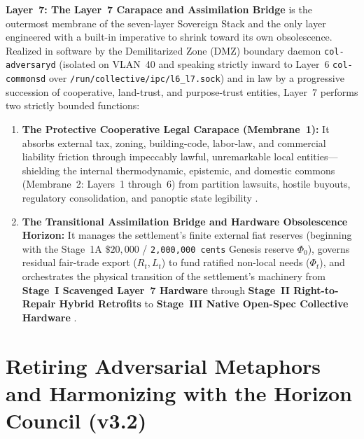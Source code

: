 \textbf{Layer~7: The Layer~7 Carapace and Assimilation Bridge} is the outermost membrane of the seven-layer Sovereign Stack and the only layer engineered with a built-in imperative to shrink toward its own obsolescence. Realized in software by the Demilitarized Zone (DMZ) boundary daemon \texttt{col-adversaryd} (isolated on VLAN~40 and speaking strictly inward to Layer~6 \texttt{col-commonsd} over \texttt{/run/collective/ipc/l6\_l7.sock}) and in law by a progressive succession of cooperative, land-trust, and purpose-trust entities, Layer~7 performs two strictly bounded functions:
\begin{enumerate}
    \item \textbf{The Protective Cooperative Legal Carapace (Membrane~1):} It absorbs external tax, zoning, building-code, labor-law, and commercial liability friction through impeccably lawful, unremarkable local entities---shielding the internal thermodynamic, epistemic, and domestic commons (Membrane~2: Layers~1 through~6) from partition lawsuits, hostile buyouts, regulatory consolidation, and panoptic state legibility \parencite{scott1998,ostrom1990}.
    \item \textbf{The Transitional Assimilation Bridge and Hardware Obsolescence Horizon:} It manages the settlement's finite external fiat reserves (beginning with the Stage~1A $\$20{,}000$ / \texttt{2,000,000 cents} Genesis reserve $\Phi_0$), governs residual fair-trade export ($R_t, L_t$) to fund ratified non-local needs ($\Phi_t$), and orchestrates the physical transition of the settlement's machinery from \textbf{Stage~I Scavenged Layer~7 Hardware} through \textbf{Stage~II Right-to-Repair Hybrid Retrofits} to \textbf{Stage~III Native Open-Spec Collective Hardware} \parencite{perzanowski2022right,illich1973}.
\end{enumerate}

\section*{Retiring Adversarial Metaphors and Harmonizing with the Horizon Council (v3.2)}

